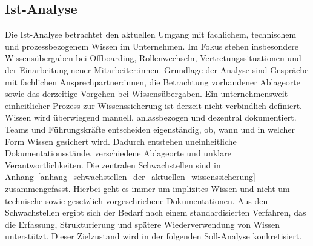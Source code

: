 \documentclass[
  10pt,
  ngerman,
  a4paper,
  toc=graduated,
  numbers=noenddot,
  headings=standardclasses,
  nonumberlist
]{scrartcl}
\begin{document}
\subsection{Ist-Analyse}
\label{ist_analyse}

Die Ist-Analyse betrachtet den aktuellen Umgang mit fachlichem, technischem und prozessbezogenem Wissen im Unternehmen. Im Fokus stehen insbesondere Wissensübergaben bei Offboarding, Rollenwechseln, Vertretungssituationen und der Einarbeitung neuer Mitarbeiter:innen. Grundlage der Analyse sind Gespräche mit fachlichen Ansprechpartner:innen, die Betrachtung vorhandener Ablageorte sowie das derzeitige Vorgehen bei Wissensübergaben. Ein unternehmensweit einheitlicher Prozess zur Wissenssicherung ist derzeit nicht verbindlich definiert. Wissen wird überwiegend manuell, anlassbezogen und dezentral dokumentiert. Teams und Führungskräfte entscheiden eigenständig, ob, wann und in welcher Form Wissen gesichert wird. Dadurch entstehen uneinheitliche Dokumentationsstände, verschiedene Ablageorte und unklare Verantwortlichkeiten. Die zentralen Schwachstellen sind in Anhang~\ref{anhang_schwachstellen_der_aktuellen_wissenssicherung} zusammengefasst. Hierbei geht es immer um implizites Wissen und nicht um technische sowie gesetzlich vorgeschriebene Dokumentationen. Aus den Schwachstellen ergibt sich der Bedarf nach einem standardisierten Verfahren, das die Erfassung, Strukturierung und spätere Wiederverwendung von Wissen unterstützt. Dieser Zielzustand wird in der folgenden Soll-Analyse konkretisiert.

\end{document}
